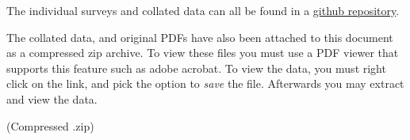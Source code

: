     The individual surveys and collated data can all be found in a \href{https://github.com/brendonky18/Honors-Thesis.Data}{github repository}.

    The collated data, and original PDFs have also been attached to this document as a compressed zip archive. To view these files you must use a PDF viewer that supports this feature such as adobe acrobat. To view the data, you must right click on the link, and pick the option to \emph{save} the file. Afterwards you may extract and view the data. 
    
    \textbf{} (Compressed .zip)